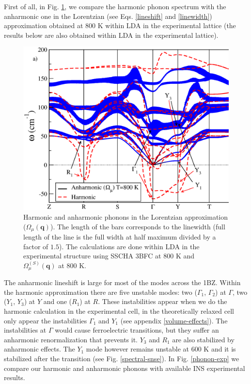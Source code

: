 First of all, in Fig. \ref{spectrum-phonon-snse}, we compare the harmonic phonon spectrum with the anharmonic one in the Lorentzian (see Eqs. \ref{lineshift} and \ref{linewidth}) approximation obtained at $800$ K within LDA in 
the experimental lattice (the results below are also obtained within LDA in the experimental lattice).
\begin{figure}[h]
\includegraphics[width=\linewidth]{Figures/spectrum-snse.eps}
\caption[Phonons in the Lorentzian approximation in SnSe.]{Harmonic and anharmonic phonons in the Lorentzian approximation ($\Omega_{\mu}(\mathbf{q})$). The length of the bars corresponds to the linewidth (full length of the line 
is the full width at half maximum divided by a factor of $1.5$). The calculations are done within LDA in the experimental structure using SSCHA 3BFC at $800$ K and $\Omega^{(S)}_{\mu}(\mathbf{q})$ at $800$ K.}
\label{spectrum-phonon-snse}
\end{figure}
The anharmonic lineshift is large for most of the modes across the 1BZ. Within the harmonic approximation there are five unstable modes: two ($\Gamma_{1}$, $\Gamma_{2}$) at $\Gamma$, two ($Y_{1}$, $Y_{3}$) at $Y$ and one 
($R_{1}$) at $R$. These instabilities appear when we do the harmonic calculation in the experimental cell, in the theoretically relaxed cell only appear the instabilities $\Gamma_{1}$ and $Y_{1}$ (see appendix \ref{volume-effects}). The instabilities at $\Gamma$ would cause ferroelectric transitions\cite{skelton2016anharmonicity,hong2016electronic}, but they suffer an anharmonic renormalization that prevents it. $Y_{3}$ and $R_{1}$ are also stabilized by anharmonic effects. The $Y_{1}$ mode however remains unstable at $600$ K and it is stabilized after the transition (see Fig. \ref{spectral-snse}). In Fig. \ref{phonon-exp} we compare our harmonic and anharmonic phonons with available INS experimental results\cite{chatterji2018soft}. 
